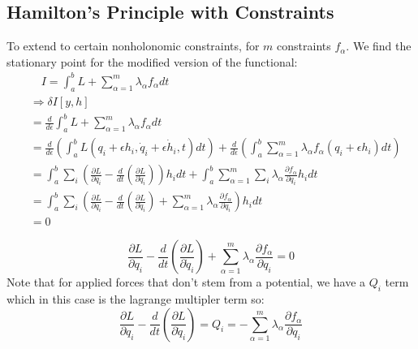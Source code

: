 \documentclass[12pt]{article}
\begin{document}
\subsection{Hamilton's Principle with Constraints}
To extend to certain nonholonomic constraints,  for $m$ constraints $f_\alpha$. We find the stationary point for the modified version of the functional: 
$$ \begin{aligned} 
	&\quad I = \int^b_a L + \sum_{\alpha = 1}^m \lambda_\alpha f_\alpha dt  \\
	&\Rightarrow  \delta I[y, h]  \\
	&= \frac{d}{d\epsilon} \int^b_a L + \sum_{\alpha = 1}^m \lambda_\alpha f_\alpha dt \\
	&=  \frac{d}{d\epsilon} \left(\int^b_a L(q_i + \epsilon h_i, \dot{q}_i + \epsilon \dot{h}_i, t) dt  \right) +   \frac{d}{d\epsilon}  \left(\int_a^b \sum_{\alpha = 1}^m \lambda_\alpha f_\alpha (q_i + \epsilon h_i)dt \right) \\
	&= \int_a^b \sum_i \left( \frac{\partial L}{\partial q_i} -  \frac{d}{dt}\left(\frac{\partial L}{\partial \dot{q}_i}\right) \right) h_i dt + \int_a^b  \sum_{\alpha = 1}^m \sum_i \lambda_\alpha \frac{\partial f_\alpha}{\partial q_i}h_i dt  \\
	&= \int_a^b \sum_i \left( \frac{\partial L}{\partial q_i} -  \frac{d}{dt}\left(\frac{\partial L}{\partial \dot{q}_i}\right) +  \sum_{\alpha = 1}^m \lambda_\alpha \frac{\partial f_\alpha}{\partial q_i} \right) h_i dt \\
	&= 0
\end{aligned}$$ 

\begin{theorem}
\textnormal{
 $$  \frac{\partial L}{\partial q_i} -  \frac{d}{dt}\left(\frac{\partial L}{\partial \dot{q}_i}\right) +  \sum_{\alpha = 1}^m \lambda_\alpha \frac{\partial f_\alpha}{\partial q_i} = 0 $$
Note that for applied forces that don't stem from a potential, we have a $Q_i$ term which in this case is the lagrange multipler term so:
$$ \frac{\partial L}{\partial q_i} -  \frac{d}{dt}\left(\frac{\partial L}{\partial \dot{q}_i}\right) = Q_i = - \sum_{\alpha = 1}^m \lambda_\alpha \frac{\partial f_\alpha}{\partial q_i} $$ 
}
\end{theorem}
\end{document}
